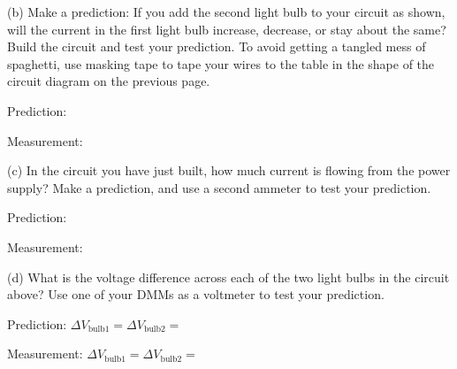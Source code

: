 (b) Make a prediction: If you add the second light bulb to your circuit as shown, will the current in the first light bulb increase, decrease, or stay about the same?  Build the circuit and test your prediction. To avoid getting a tangled mess of spaghetti, use masking tape to tape your wires to the table in the shape of the circuit diagram on the previous page.\par
\vspace{0.1 in}
\hspace{0.5 in} Prediction:  \par
\vspace{0.2 in}
\hspace{0.5 in} Measurement:  \par
\vspace{0.25 in}

(c)  In the circuit you have just built, how much current is flowing from the power supply?  Make a prediction, and use a second ammeter to test your prediction. \par
\vspace{0.1 in}
\hspace{0.5 in} Prediction:   \par
\vspace{0.2 in}
\hspace{0.5 in} Measurement:  \par
\vspace{0.25 in}

\begin{center}
 \par
\end{center}


(d) What is the voltage difference across each of the two light bulbs in the circuit above?  Use one of your DMMs as a voltmeter to test your prediction. \par
\vspace{0.1 in}
\hspace{0.5 in} Prediction: \hspace{0.11 in} $\Delta V_{\mathrm{bulb1}} = $\hspace{0.7 in}$ \Delta V_{\mathrm{bulb2}} = $ \par
\vspace{0.2 in}
\hspace{0.5 in} Measurement:  $\Delta V_{\mathrm{bulb1}} = $\hspace{0.7 in}$ \Delta V_{\mathrm{bulb2}} = $ \par
\vspace{0.25 in}

